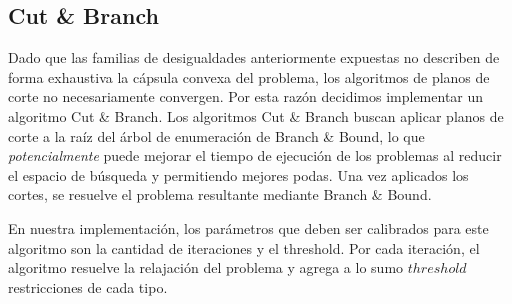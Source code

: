 \subsection{Cut \& Branch}

Dado que las familias de desigualdades anteriormente expuestas no describen de forma exhaustiva la cápsula convexa del problema, los algoritmos de planos de corte no necesariamente convergen. Por esta razón decidimos implementar un algoritmo Cut \& Branch. Los algoritmos Cut \& Branch buscan aplicar planos de corte a la raíz del árbol de enumeración de Branch \& Bound, lo que \textit{potencialmente} puede mejorar el tiempo de ejecución de los problemas al reducir el espacio de búsqueda y permitiendo mejores podas. Una vez aplicados los cortes, se resuelve el problema resultante mediante Branch \& Bound.

En nuestra implementación, los parámetros que deben ser calibrados para este algoritmo son la cantidad de iteraciones y el threshold. Por cada iteración, el algoritmo resuelve la relajación del problema y agrega a lo sumo $threshold$ restricciones de cada tipo.